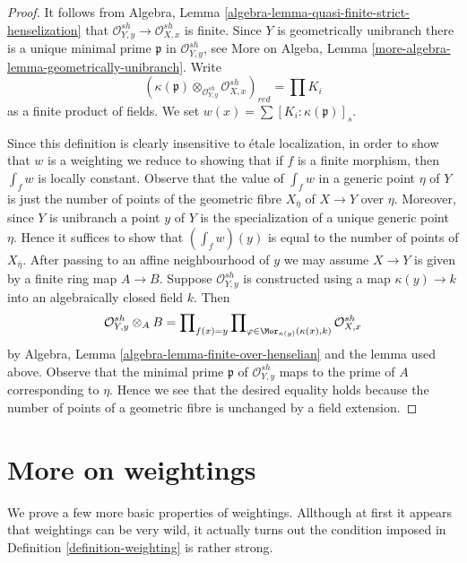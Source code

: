 \begin{proof}
It follows from Algebra, Lemma
\ref{algebra-lemma-quasi-finite-strict-henselization}
that $\mathcal{O}_{Y, y}^{sh} \to \mathcal{O}_{X, x}^{sh}$
is finite. Since $Y$ is geometrically unibranch
there is a unique minimal prime $\mathfrak p$ in
$\mathcal{O}_{Y, y}^{sh}$, see
More on Algeba, Lemma \ref{more-algebra-lemma-geometrically-unibranch}.
Write
$$
(\kappa(\mathfrak p) \otimes_{\mathcal{O}_{Y, y}^{sh}}
\mathcal{O}_{X, x}^{sh})_{red} =
\prod K_i
$$
as a finite product of fields.
We set $w(x) = \sum [K_i : \kappa(\mathfrak p)]_s$.

\medskip\noindent
Since this definition is clearly insensitive to \'etale localization,
in order to show that $w$ is a weighting we reduce to showing that if
$f$ is a finite morphism, then $\int_f w$ is locally constant.
Observe that the value of $\int_f w$ in a generic point $\eta$
of $Y$ is just the number of points of the geometric fibre
$X_{\overline{\eta}}$ of $X \to Y$ over $\eta$. Moreover, since
$Y$ is unibranch a point $y$ of $Y$ is the specialization of a unique
generic point $\eta$. Hence it suffices to show that $(\int_f w)(y)$
is equal to the number of points of $X_{\overline{\eta}}$.
After passing to an affine neighbourhood of $y$ we may assume
$X \to Y$ is given by a finite ring map $A \to B$. Suppose
$\mathcal{O}_{Y, y}^{sh}$ is constructed using a map
$\kappa(y) \to k$ into an algebraically closed field $k$.
Then
$$
\mathcal{O}_{Y, y}^{sh} \otimes_A B =
\prod\nolimits_{f(x) = y}
\prod\nolimits_{\varphi \in \Mor_{\kappa(y)}(\kappa(x), k)}
\mathcal{O}_{X, x}^{sh}
$$
by Algebra, Lemma \ref{algebra-lemma-finite-over-henselian}
and the lemma used above.
Observe that the minimal prime $\mathfrak p$ of $\mathcal{O}_{Y, y}^{sh}$
maps to the prime of $A$ corresponding to $\eta$. Hence we see that
the desired equality holds because the number of points of a geometric
fibre is unchanged by a field extension.
\end{proof}



\section{More on weightings}
\label{section-more-weightings}

\noindent
We prove a few more basic properties of weightings. Allthough
at first it appears that weightings can be very wild, it
actually turns out the condition imposed in
Definition \ref{definition-weighting} is rather strong.

